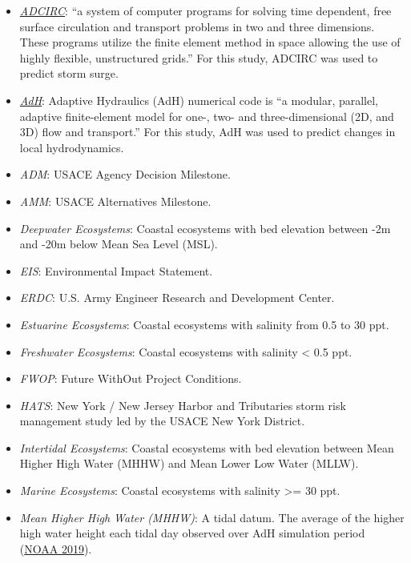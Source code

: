 \documentclass[
]{book}
\providecommand{\tightlist}{%
  \setlength{\itemsep}{0pt}\setlength{\parskip}{0pt}}
\begin{document}
\begin{itemize}
\tightlist
\item
  \emph{\href{https://adcirc.org/}{ADCIRC}}: ``a system of computer programs for solving time dependent, free surface circulation and transport problems in two and three dimensions. These programs utilize the finite element method in space allowing the use of highly flexible, unstructured grids.'' For this study, ADCIRC was used to predict storm surge.
\item
  \emph{\href{https://www.erdc.usace.army.mil/Media/Fact-Sheets/Fact-Sheet-Article-View/Article/476708/ada/}{AdH}}: Adaptive Hydraulics (AdH) numerical code is ``a modular, parallel, adaptive finite-element model for one-, two- and three-dimensional (2D, and 3D) flow and transport.'' For this study, AdH was used to predict changes in local hydrodynamics.
\item
  \emph{ADM}: USACE Agency Decision Milestone.
\item
  \emph{AMM}: USACE Alternatives Milestone.
\item
  \emph{Deepwater Ecosystems}: Coastal ecosystems with bed elevation between -2m and -20m below Mean Sea Level (MSL).
\item
  \emph{EIS}: Environmental Impact Statement.
\item
  \emph{ERDC}: U.S. Army Engineer Research and Development Center.\\
\item
  \emph{Estuarine Ecosystems}: Coastal ecosystems with salinity from 0.5 to 30 ppt.
\item
  \emph{Freshwater Ecosystems}: Coastal ecosystems with salinity \textless{} 0.5 ppt.
\item
  \emph{FWOP}: Future WithOut Project Conditions.
\item
  \emph{HATS}: New York / New Jersey Harbor and Tributaries storm risk management study led by the USACE New York District.\\
\item
  \emph{Intertidal Ecosystems}: Coastal ecosystems with bed elevation between Mean Higher High Water (MHHW) and Mean Lower Low Water (MLLW).
\item
  \emph{Marine Ecosystems}: Coastal ecosystems with salinity \textgreater= 30 ppt.
\item
  \emph{Mean Higher High Water (MHHW)}: A tidal datum. The average of the higher high water height each tidal day observed over AdH simulation period (\href{https://shoreline.noaa.gov/glossary.html}{NOAA 2019}).

\end{itemize}
\end{document}

